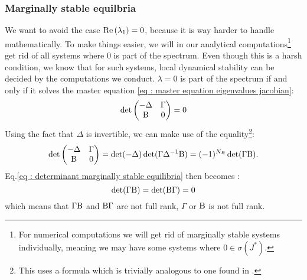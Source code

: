 \documentclass[12pt, titlepage]{report}
\begin{document}
\subsubsection{Marginally stable equilbria}
We want to avoid the case $\text{Re}\left(\lambda_1\right)=0$, because it is way harder to handle mathematically. To make things easier, we will in our analytical computations\footnote{For numerical computations we will get rid of marginally stable systems individually, meaning we may have some systems where $0 \in \sigma(J^*)$.} get rid of all systems where 0 is part of the spectrum. Even though this is a harsh condition, we know that for such systems, local dynamical stability can be decided by the computations we conduct. $\lambda=0$ is part of the spectrum if and only if it solves the master equation \eqref{eq : master equation eigenvalues jacobian}:
\begin{equation}
\det
\begin{pmatrix}
  -\Delta   & \Gamma \\
  \text{B} & 0
\end{pmatrix} = 0 \label{eq : determinant marginally stable equilibria}
\end{equation}
Using the fact that $\Delta$ is invertible, we can make use of the equality\footnote{This uses a formula which is trivially analogous to one found in \cite{powell_calculating_2011}.}:
\begin{equation}
\det\begin{pmatrix}
  -\Delta   & \Gamma \\
  \text{B} & 0
\end{pmatrix} = \det(-\Delta)\det(\Gamma\Delta^{-1}\text{B}) = (-1)^{N_R}\det(\Gamma\text{B}).
\end{equation}
Eq.\eqref{eq : determinant marginally stable equilibria} then becomes :
\begin{equation}
\det(\Gamma\text{B})=\det(\text{B}\Gamma)=0
\end{equation}
which means that $\Gamma\text{B}$ and $\text{B}\Gamma$ are not full rank, \ie $\Gamma$ or $\text{B}$ is not full rank.
\end{document}
